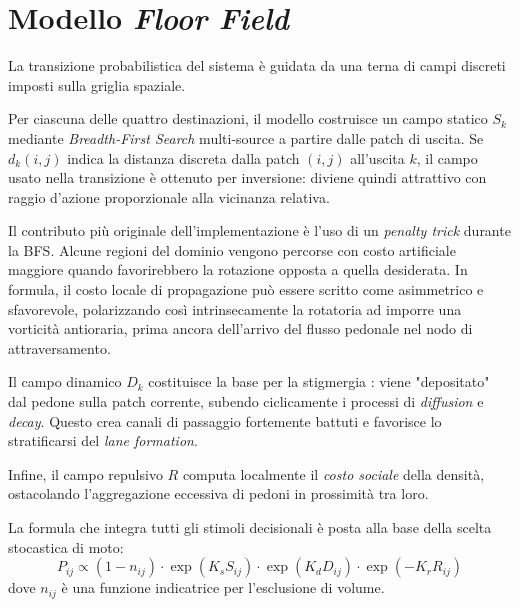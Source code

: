 \section{Modello \textit{Floor Field}}
La transizione probabilistica del sistema è guidata da una terna di campi discreti imposti sulla griglia spaziale.

Per ciascuna delle quattro destinazioni, il modello costruisce un campo statico $S_k$ mediante \textit{Breadth-First Search} multi-source a partire dalle patch di uscita. Se $d_k(i,j)$ indica la distanza discreta dalla patch $(i,j)$ all'uscita $k$, il campo usato nella transizione è ottenuto per inversione: diviene quindi attrattivo con raggio d'azione proporzionale alla vicinanza relativa.

Il contributo più originale dell'implementazione è l'uso di un \textit{penalty trick} durante la BFS. Alcune regioni del dominio vengono percorse con costo artificiale maggiore quando favorirebbero la rotazione opposta a quella desiderata. In formula, il costo locale di propagazione può essere scritto come asimmetrico e sfavorevole, polarizzando così intrinsecamente la rotatoria ad imporre una vorticità antioraria, prima ancora dell'arrivo del flusso pedonale nel nodo di attraversamento.

Il campo dinamico $D_k$ costituisce la base per la stigmergia \cite{burstedde2001}: viene "depositato" dal pedone sulla patch corrente, subendo ciclicamente i processi di \textit{diffusion} e \textit{decay}. Questo crea canali di passaggio fortemente battuti e favorisce lo stratificarsi del \textit{lane formation}.

Infine, il campo repulsivo $R$ computa localmente il \textit{costo sociale} della densità, ostacolando l'aggregazione eccessiva di pedoni in prossimità tra loro.

La formula che integra tutti gli stimoli decisionali è posta alla base della scelta stocastica di moto:
$$
P_{ij} \propto (1 - n_{ij}) \cdot \exp(K_s S_{ij}) \cdot \exp(K_d D_{ij}) \cdot \exp(-K_r R_{ij})
$$
dove $n_{ij}$ è una funzione indicatrice per l'esclusione di volume.
